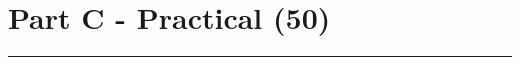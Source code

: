 \section*{Part C - Practical (50)}

\noindent \begin{center}
\rule[0.5ex]{1\linewidth}{1pt}
\par\end{center}

\begin{comment}
M57.biz is a web start-up company in the United States that is developing a
body art catalogue. The company had $3 million in seed funding and is now
worth about $10 million. It has two founders who are the owners, and 10
additional employees. The current employees are as follows:
     President: Alison Smith
     Chief Financial Ocer: Jean
     Programmers: Bob, Carole, David, and Emmy
     Marketing: Gina and Harris
     BizDev: Indy
M57.biz is a virtual company. The programmers work from their homes and
engage in daily online chat sessions. They have a weekly in-person meeting in
a local office park. Marketing and BizDev are mostly on the road and work
out of their hotel rooms or Starbucks. They have an in-person meeting once
every two week. Most documents that are exchanged in the company are ex-
changed by e-mail. A spreadsheet containing confidential information from
M57.biz was discovered posted on a competitor's website in a technical sup-
port forum, where it was an attachment to a forum post. The spreadsheet was
called M57plan.xlsx". The spreadsheet had originally been created by Jean,
the Chief Financial Officer on her company laptop.
Forensic investigators have interviewed Jean who stated that Alison had
asked her to prepare the spreadsheet as part of a new funding round for the
company, and that Alison had asked her to send the spreadsheet to her by e-
mail. Alison stated that she did not know what Jean was talking about, and
that she had never asked her for the spreadsheet and had never received it by
e-mail. The forensic investigators have forensically imaged the hard drive from
Jean's computer and have provided you the image for forensic examination and
analysis (available via the course page). One of the founders, who have retained
the forensic investigators and you, wants to know the following:
     When did Jean create this spreadsheet?
     How did it get from her computer to the competitor's website?
     Who else from the company is involved?
You are required to conduct a forensic examination of the evidence and prepare

\end{comment}
